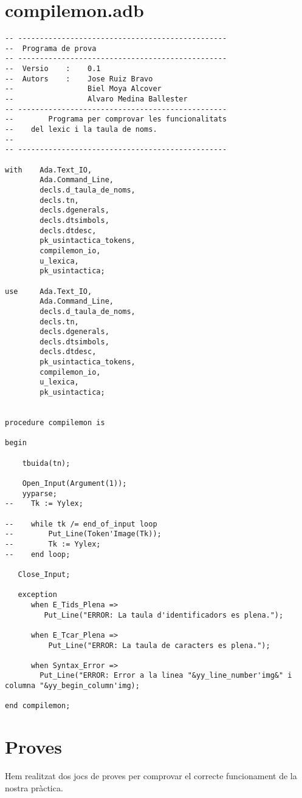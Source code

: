 \documentclass[10pt]{report}
\begin{document}
    \section{compilemon.adb}
    \begin{lstlisting}[style=Ada]
-- ------------------------------------------------
--  Programa de prova
-- ------------------------------------------------
--  Versio    :    0.1
--  Autors    :    Jose Ruiz Bravo
--                 Biel Moya Alcover
--                 Alvaro Medina Ballester
-- ------------------------------------------------
--        Programa per comprovar les funcionalitats
--    del lexic i la taula de noms.
--
-- ------------------------------------------------

with    Ada.Text_IO,
        Ada.Command_Line,
        decls.d_taula_de_noms,
        decls.tn,
        decls.dgenerals,
        decls.dtsimbols,
        decls.dtdesc,
        pk_usintactica_tokens,
        compilemon_io,
        u_lexica,
        pk_usintactica;
        
use     Ada.Text_IO,
        Ada.Command_Line,
        decls.d_taula_de_noms,
        decls.tn,
        decls.dgenerals,
        decls.dtsimbols,
        decls.dtdesc,
        pk_usintactica_tokens,
        compilemon_io,
        u_lexica,
        pk_usintactica;
        

procedure compilemon is

begin

    tbuida(tn);
    
    Open_Input(Argument(1));
    yyparse;
--    Tk := Yylex;
    
--    while tk /= end_of_input loop
--        Put_Line(Token'Image(Tk));
--        Tk := Yylex;
--    end loop;
   
   Close_Input;
   
   exception
      when E_Tids_Plena => 
         Put_Line("ERROR: La taula d'identificadors es plena.");
         
      when E_Tcar_Plena =>
          Put_Line("ERROR: La taula de caracters es plena.");
          
      when Syntax_Error =>
        Put_Line("ERROR: Error a la linea "&yy_line_number'img&" i columna "&yy_begin_column'img);

end compilemon;
    \end{lstlisting}
    \newpage
    
    
    \section{Proves}
    Hem realitzat dos jocs de proves per comprovar el correcte funcionament de la nostra pràctica.
    \\
\end{document}
